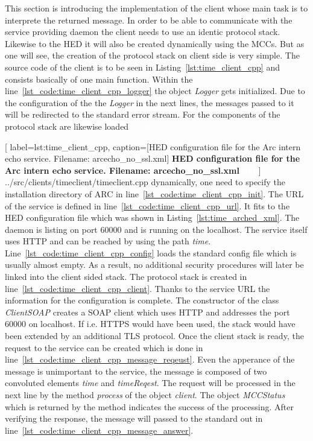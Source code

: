 This section is introducing the implementation of the client whose main task is to interprete the returned message.
In order to be able to communicate with the service providing daemon the client needs to use an identic protocol stack.
Likewise to the HED it will also be created dynamically using the MCCs.
But as one will see, the creation of the protocol stack on client side is very simple.
%
%
%
The source code of the client is to be seen in Listing~\ref{lst:time_client_cpp} and consists basically of one main function. Within the line~\ref{lst_code:time_client_cpp_logger} the object \textit{Logger} gets initialized. Due to the configuration of the the \textit{Logger} in the next lines, the messages passed to it will be redirected to the standard error stream.
%
For the components of the protocol stack are likewise loaded \textcolor{white}{newline}

	[
	label=lst:time_client_cpp,
	caption={[HED configuration file for the Arc intern echo service. Filename: arcecho\_no\_ssl.xml]
	\textbf{HED configuration file for the Arc intern echo service. Filename: arcecho\_no\_ssl.xml\textcolor{white}{hmf}}}
	]
{../src/clients/timeclient/timeclient.cpp}
 dynamically, one need to specify the installation directory of ARC in line~\ref{lst_code:time_client_cpp_init}.
%
The URL of the service is defined in line~\ref{lst_code:time_client_cpp_url}. It fits to the HED configuration file which was shown in Listing~\ref{lst:time_arched_xml}. 
The daemon is listing on port 60000 and is running on the localhost. The service itself uses HTTP and can be reached by using the path \textit{time}.
Line~\ref{lst_code:time_client_cpp_config} loads the standard config file which is usually almost empty. As a result, no additional security procedures will later be linked into the client sided stack. 
The protocol stack is created in line~\ref{lst_code:time_client_cpp_client}. 
Thanks to the service URL the information for the configuration is complete.
The constructor of the class \textit{ClientSOAP} creates a SOAP client which uses HTTP and addresses the port 60000 on localhost. If i.e. HTTPS would have been used, the stack would have been extended by an additional TLS protocol.
Once the client stack is ready, the request to the service can be created which is done in line~\ref{lst_code:time_client_cpp_message_reqeust}. Even the apperance of the message is unimportant to the service, the message is composed of two convoluted elements \textit{time} and \textit{timeReqest}.
%
The request will be processed in the next line by the method \textit{process} of the object \textit{client}.%
The object \textit{MCCStatus} which is returned by the method indicates the success of the processing.
After verifying the response, the message will passed to the standard out in line~\ref{lst_code:time_client_cpp_message_answer}.\\


